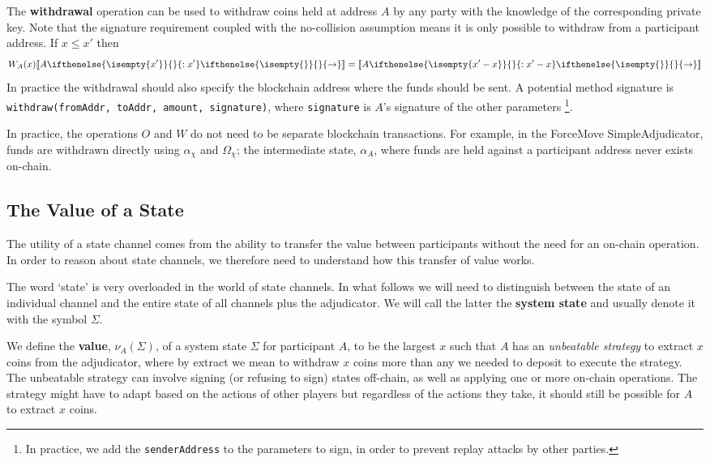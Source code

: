 \documentclass{article}
\theoremstyle{definition}
\newcommand{\adj}[1]{\llbracket #1 \rrbracket}
\newcommand{\holds}[3]{#1 %
  \ifthenelse{\isempty{#2}}{}{: #2} %
  \ifthenelse{\isempty{#3}}{}{\rightarrow #3} %
}
\begin{document}
The \textbf{withdrawal} operation can be used to withdraw coins held at address $A$ by any
party with the knowledge of the corresponding private key. 
Note that the signature requirement coupled with the no-collision assumption means
it is only possible to withdraw from a participant address.
If $x \leq x'$ then
\begin{align*}
W_A(x) \adj{\holds{A}{x'}{}} = \adj{\holds{A}{x'-x}{}}
\end{align*}
In practice the withdrawal should also specify the blockchain address where the funds should be sent.
A potential method signature is \texttt{withdraw(fromAddr, toAddr, amount, signature)}, 
where \texttt{signature} is $A$'s signature of the other parameters
\footnote{In practice, we add the \texttt{senderAddress} to the parameters to sign,
in order to prevent replay attacks by other parties.}.

In practice, the operations $O$ and $W$ do not need to be separate blockchain transactions.
For example, in the ForceMove SimpleAdjudicator, funds are withdrawn directly using $\alpha_\chi$ and $\Omega_\chi$;
the intermediate state, $\alpha_A$, where funds are held against a participant address never exists on-chain.

\subsection{The Value of a State}\label{section:value-of-a-state}

The utility of a state channel comes from the ability to transfer the value
between participants without the need for an on-chain operation.
In order to reason about state channels, we therefore need to understand how this transfer
of value works.

The word `state' is very overloaded in the world of state channels.
In what follows we will need to distinguish between the state of an individual channel and
the entire state of all channels plus the adjudicator.
We will call the latter the \textbf{system state} and usually denote it with the symbol $\Sigma$.

We define the \textbf{value}, $\nu_A(\Sigma)$, of a system state $\Sigma$ for participant $A$,
to be the largest $x$ such that $A$ has an \textit{unbeatable strategy} to extract $x$
coins from the adjudicator, where by extract we mean to withdraw $x$ coins more than any we needed to deposit to execute the strategy.
The unbeatable strategy can involve signing (or refusing to sign) states off-chain, as well as
applying one or more on-chain operations.
The strategy might have to adapt based on the actions of other players but regardless of
the actions they take, it should still be possible for $A$ to extract $x$ coins.
\end{document}

